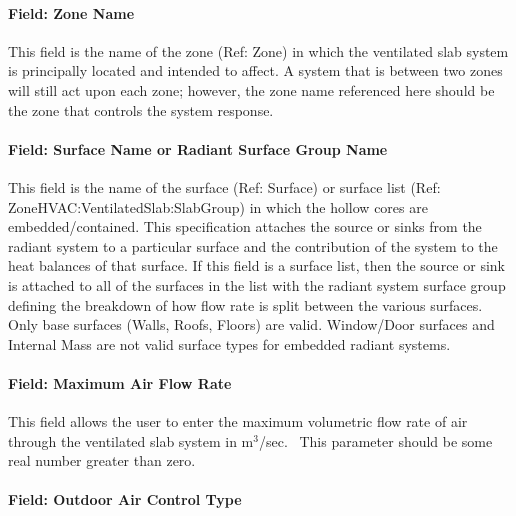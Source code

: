 \paragraph{Field: Zone Name}\label{field-zone-name-4-004}

This field is the name of the zone (Ref: Zone) in which the ventilated slab system is principally located and intended to affect. A system that is between two zones will still act upon each zone; however, the zone name referenced here should be the zone that controls the system response.

\paragraph{Field: Surface Name or Radiant Surface Group Name}\label{field-surface-name-or-radiant-surface-group-name-3}

This field is the name of the surface (Ref: Surface) or surface list (Ref: ZoneHVAC:VentilatedSlab:SlabGroup) in which the hollow cores are embedded/contained. This specification attaches the source or sinks from the radiant system to a particular surface and the contribution of the system to the heat balances of that surface. If this field is a surface list, then the source or sink is attached to all of the surfaces in the list with the radiant system surface group defining the breakdown of how flow rate is split between the various surfaces. Only base surfaces (Walls, Roofs, Floors) are valid. Window/Door surfaces and Internal Mass are not valid surface types for embedded radiant systems.

\paragraph{Field: Maximum Air Flow Rate}\label{field-maximum-air-flow-rate-001}

This field allows the user to enter the maximum volumetric flow rate of air through the ventilated slab system in m\(^{3}\)/sec.~ This parameter should be some real number greater than zero.

\paragraph{Field: Outdoor Air Control Type}\label{field-outdoor-air-control-type}

